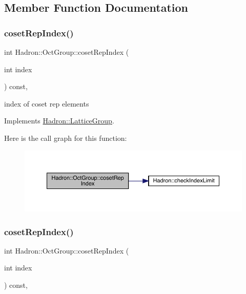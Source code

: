 \subsection{Member Function Documentation}
\mbox{\label{structHadron_1_1OctGroup_aeaabc93ad3df1b585bc1009b0bf4f5ba}} 
\subsubsection{\texorpdfstring{cosetRepIndex()}{cosetRepIndex()}\hspace{0.1cm}{\footnotesize\ttfamily [1/3]}}
{\footnotesize\ttfamily int Hadron\+::\+Oct\+Group\+::coset\+Rep\+Index (\begin{DoxyParamCaption}\item[{int}]{index }\end{DoxyParamCaption}) const\hspace{0.3cm}{\ttfamily [inline]}, {\ttfamily [virtual]}}

index of coset rep elements 

Implements \mbox{\hyperlink{structHadron_1_1LatticeGroup_a7e3b9b5e2f596e6c40d64aa939a3ad6c}{Hadron\+::\+Lattice\+Group}}.

Here is the call graph for this function\+:
\nopagebreak
\begin{figure}[H]
\begin{center}
\leavevmode
\includegraphics[width=350pt]{d1/de5/structHadron_1_1OctGroup_aeaabc93ad3df1b585bc1009b0bf4f5ba_cgraph}
\end{center}
\end{figure}
\mbox{\label{structHadron_1_1OctGroup_aeaabc93ad3df1b585bc1009b0bf4f5ba}} 
\subsubsection{\texorpdfstring{cosetRepIndex()}{cosetRepIndex()}\hspace{0.1cm}{\footnotesize\ttfamily [2/3]}}
{\footnotesize\ttfamily int Hadron\+::\+Oct\+Group\+::coset\+Rep\+Index (\begin{DoxyParamCaption}\item[{int}]{index }\end{DoxyParamCaption}) const\hspace{0.3cm}{\ttfamily [inline]}, {\ttfamily [virtual]}}

